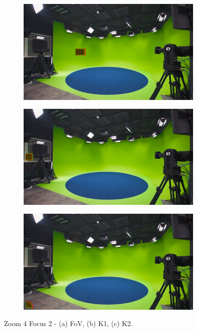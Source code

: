 \begin{figure}[h]
    \centering
    \begin{subfigure}[b]{0.45\textwidth}
        \includegraphics[width=\textwidth]{Images/08annex/results/8.2.png}
        \caption{}
        \label{fig:a23}
    \end{subfigure}
    \hfill
    \begin{subfigure}[b]{0.45\textwidth}
        \includegraphics[width=\textwidth]{Images/08annex/results/8.3.png}
        \caption{}
        \label{fig:b2}
    \end{subfigure}
    
    \vspace{0.5cm}
    
    \begin{subfigure}[b]{0.45\textwidth}
        \includegraphics[width=\textwidth]{Images/08annex/results/8.4.png}
        \caption{}
        \label{fig:c2}
    \end{subfigure}

    \caption{Zoom 4 Focus 2 - (a) FoV, (b) K1, (c) K2.}
    \label{fig:vir_fov_cal}
\end{figure}

